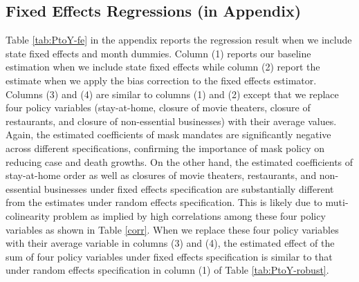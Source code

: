 \documentclass[11pt,reqno,letter]{amsart}
\theoremstyle{definition}
\begin{document}
\subsection{Fixed Effects Regressions (in Appendix)}

Table \ref{tab:PtoY-fe} in the appendix reports the regression result when we include state fixed effects and month dummies. Column (1) reports our baseline estimation when we include state fixed effects while column (2) report the estimate when we apply the bias correction to the fixed effects estimator. Columns (3) and (4) are similar to columns (1) and (2) except that we replace  four policy variables  (stay-at-home, closure of movie theaters, closure of restaurants, and closure of non-essential businesses) with their average values.  Again, the estimated coefficients of mask mandates are significantly negative across different specifications, confirming the importance of mask policy on reducing case and death growths. On the other hand,  the estimated coefficients of stay-at-home order as well as closures of movie theaters, restaurants, and non-essential businesses under fixed effects specification are substantially different from the estimates under random effects specification. This is likely due to muti-colinearity problem as implied by  high correlations among these four policy variables as shown in Table \ref{corr}. When we replace these four policy variables with their average variable in columns (3) and (4), the estimated effect of the sum of four policy variables under fixed effects specification is similar to that under random effects specification in column (1) of Table \ref{tab:PtoY-robust}. 
\end{document}
